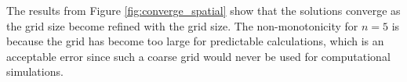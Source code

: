   The results from Figure \ref{fig:converge_spatial} show that the solutions converge as the grid size become refined with the grid size.
  The non-monotonicity for $n = 5$ is because the grid has become too large for predictable calculations, which is an acceptable error since such a coarse grid would never be used for computational simulations.


%
%
%
 
%
%
%


